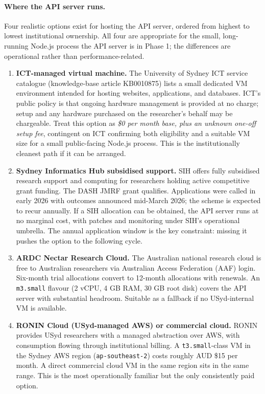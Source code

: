 \documentclass[11pt,a4paper]{article}
\begin{document}
\paragraph{Where the API server runs.} Four realistic options exist for hosting the API server, ordered from highest to lowest institutional ownership. All four are appropriate for the small, long-running Node.js process the API server is in Phase 1; the differences are operational rather than performance-related.

\begin{enumerate}[leftmargin=1.5em,itemsep=4pt]
  \item \textbf{ICT-managed virtual machine.} The University of Sydney ICT service catalogue (knowledge-base article KB0010875) lists a small dedicated VM environment intended for hosting websites, applications, and databases. ICT's public policy is that ongoing hardware management is provided at no charge; setup and any hardware purchased on the researcher's behalf may be chargeable. Treat this option as \emph{\$0 per month base, plus an unknown one-off setup fee}, contingent on ICT confirming both eligibility and a suitable VM size for a small public-facing Node.js process. This is the institutionally cleanest path if it can be arranged.
  \item \textbf{Sydney Informatics Hub subsidised support.} SIH offers fully subsidised research support and computing for researchers holding active competitive grant funding. The DASH JMRF grant qualifies. Applications were called in early 2026 with outcomes announced mid-March 2026; the scheme is expected to recur annually. If a SIH allocation can be obtained, the API server runs at no marginal cost, with patches and monitoring under SIH's operational umbrella. The annual application window is the key constraint: missing it pushes the option to the following cycle.
  \item \textbf{ARDC Nectar Research Cloud.} The Australian national research cloud is free to Australian researchers via Australian Access Federation (AAF) login. Six-month trial allocations convert to 12-month allocations with renewals. An \texttt{m3.small} flavour (2 vCPU, 4 GB RAM, 30 GB root disk) covers the API server with substantial headroom. Suitable as a fallback if no USyd-internal VM is available.
  \item \textbf{RONIN Cloud (USyd-managed AWS) or commercial cloud.} RONIN provides USyd researchers with a managed abstraction over AWS, with consumption flowing through institutional billing. A \texttt{t3.small}-class VM in the Sydney AWS region (\texttt{ap-southeast-2}) costs roughly AUD \$15 per month. A direct commercial cloud VM in the same region sits in the same range. This is the most operationally familiar but the only consistently paid option.
\end{enumerate}
\end{document}
